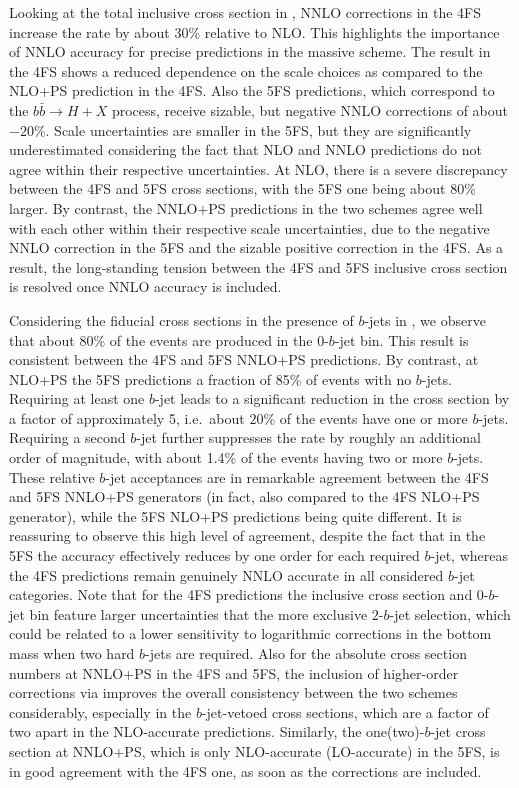 \documentclass[11pt,a4paper]{article}
\begin{document}
Looking at the total inclusive cross section in , NNLO corrections in the 4FS increase the rate by about 30\% relative to NLO. 
This highlights the importance of NNLO accuracy for precise predictions in the massive scheme. 
The \minnlo{} result in the 4FS shows a reduced dependence on the scale choices as compared to the NLO+PS prediction in the 4FS. 
Also the 5FS predictions, which correspond to the $b\bar{b} \to H+X$ process, receive sizable, but negative NNLO corrections
of about $-20$\%. Scale uncertainties are smaller in the 5FS, but they are significantly underestimated considering the fact
that NLO and NNLO predictions do not agree within their respective uncertainties.
At NLO, there is a severe discrepancy between the 4FS and 5FS cross sections, with 
the 5FS one being about 80\% larger.
By contrast, the NNLO+PS predictions in the two schemes 
agree well with each other within their respective scale uncertainties,
due to the negative NNLO correction in the 5FS and the sizable positive 
correction in the 4FS. As a result, the long-standing tension between the 4FS and 5FS 
inclusive cross section is resolved once NNLO accuracy is included.

Considering the fiducial cross sections in the presence of $b$-jets in , we observe that about 80\% of the events 
are produced in the $0$-$b$-jet bin. This result is consistent between the 4FS and 5FS NNLO+PS predictions. By contrast, at NLO+PS 
the 5FS predictions a fraction of 85\% of events with no $b$-jets. Requiring at least one $b$-jet leads to a significant reduction in the cross section by a factor 
of approximately 5, i.e.\ about $20$\% of the events have one or more $b$-jets. Requiring a second $b$-jet further suppresses the rate by roughly 
an additional order of magnitude, with about 1.4\% of the \bbH{} events having two or more $b$-jets.
These relative $b$-jet acceptances are in remarkable agreement between the 4FS and 5FS NNLO+PS generators (in fact, also
compared to the 4FS NLO+PS generator), while
the 5FS NLO+PS predictions being quite different. It is reassuring to observe this high level of agreement, despite the fact that 
in the 5FS the accuracy effectively reduces by one order for each required $b$-jet, whereas the 4FS predictions remain genuinely 
NNLO accurate in all considered $b$-jet categories.
Note that for the \minnlo{} 4FS predictions the inclusive cross section 
and $0$-$b$-jet bin feature larger uncertainties that the more exclusive $2$-$b$-jet selection,
which could be related to a lower sensitivity to logarithmic corrections in the bottom mass
when two hard $b$-jets are required.
Also for the absolute cross section numbers at NNLO+PS in the 4FS and 5FS, the inclusion of higher-order corrections 
via \minnlo{} improves the overall consistency between the two schemes considerably, especially in the $b$-jet-vetoed cross sections,
which are a factor of two apart in the NLO-accurate predictions. Similarly, the one(two)-$b$-jet cross section at NNLO+PS, which is only NLO-accurate (LO-accurate) in the 5FS, 
is in good agreement with the 4FS one, as soon as the \minnlo{} corrections are included.
\end{document}
